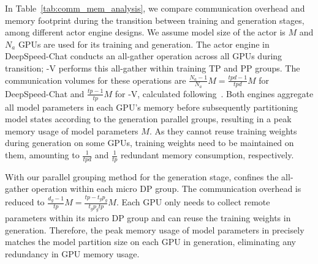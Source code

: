 In Table~\ref{tab:comm_mem_analysis}, we compare communication overhead and memory footprint during the transition between training and generation stages, among different actor engine designs. %
We assume model size of the actor is $M$ and $N_a$ GPUs are used for its training and generation. The actor engine in DeepSpeed-Chat conducts an all-gather operation across all GPUs during transition; \sysname-V performs this all-gather within training TP and PP groups. The communication volumes for these operations are %
$\frac{N_a-1}{N_a}M=\frac{tpd - 1}{tpd}M$ for DeepSpeed-Chat %
 and $\frac{tp-1}{tp}M$ for \sysname-V, calculated following~\cite{chan2007collective}. 
Both engines aggregate all model parameters in each GPU's memory before subsequently partitioning model states according to the generation parallel groups, resulting in a peak memory usage of model parameters $M$. %
As they cannot reuse training weights during generation on some GPUs, training weights need to be maintained on them, %
amounting to $\frac{1}{tpd}$ and $\frac{1}{tp}$ redundant memory consumption, respectively.






With our parallel grouping method for the generation stage, \sysname{} confines the all-gather operation within each micro DP group. 
The communication overhead is reduced to $\frac{d_g - 1}{tp}M = \frac{tp-t_gp_g}{t_gp_gtp}M$. %
Each GPU only needs to collect remote parameters within its micro DP group and can reuse the training weights in generation. Therefore, the peak memory usage of model parameters in \sysname{} precisely matches the model partition size on each GPU in generation, eliminating any redundancy in %
GPU memory usage.










